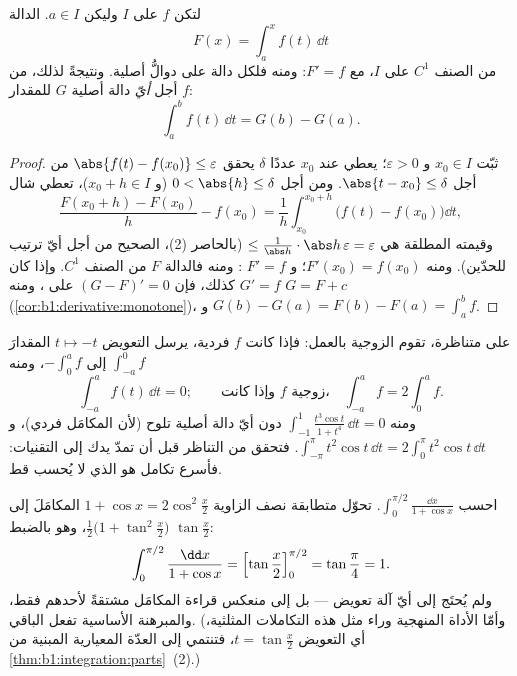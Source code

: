 \begin{theorem}\label{thm:b1:integration:ftc}
لتكن $f$  على  $I$ وليكن $a \in I$. الدالة
\[
F(x) = \int_a^x f(t)\, \dd t
\]
من الصنف $C^1$ على $I$، مع $F' = f$: ومنه فلكل دالة 
على  دوالُّ أصلية. ونتيجةً لذلك، من أجل \emph{أيّ}
دالة أصلية $G$ للمقدار $f$:
\[
\int_a^b f(t)\,\dd t = G(b) - G(a) .
\]
\end{theorem}

\begin{proof}
ثبّت $x_0 \in I$ و $\varepsilon > 0$؛ يعطي  عند $x_0$
عددًا $\delta$ يحقق $\abs{f(t) - f(x_0)} \leq \varepsilon$ من أجل $\abs{t -
x_0} \leq \delta$. ومن أجل $0 < \abs{h} \leq \delta$ (و $x_0 + h \in
I$)، تعطي شال
\[
\frac{F(x_0 + h) - F(x_0)}{h} - f(x_0)
= \frac 1h \int_{x_0}^{x_0+h} \bigl(f(t) - f(x_0)\bigr)\dd t ,
\]
وقيمته المطلقة هي $\leq \frac{1}{\abs h}\cdot \abs h\,
\varepsilon = \varepsilon$ (بالحاصر (2)، الصحيح من أجل أيّ ترتيب
للحدّين). ومنه $F'(x_0) = f(x_0)$؛ و $F' = f$ : ومنه فالدالة $F$
من الصنف $C^1$. وإذا كان $G' = f$ كذلك، فإن $(G - F)' = 0$ على ، ومنه $G =
F + c$ (\cref{cor:b1:derivative:monotone})، و $G(b) - G(a) = F(b)
- F(a) = \int_a^b f$.
\end{proof}

\begin{example}\label{ex:b1:integration:parity}
على  متناظرة، تقوم الزوجية بالعمل: فإذا كانت $f$ فردية،
يرسل التعويض $t \mapsto -t$ المقدارَ $\int_{-a}^{0} f$ إلى
$-\int_0^a f$، ومنه
\[
\int_{-a}^{a} f(t)\,\dd t = 0 ;
\qquad\text{وإذا كانت $f$ زوجية،}\quad
\int_{-a}^{a} f = 2\int_0^a f .
\]
ومنه $\int_{-1}^{1} \frac{t^3\cos t}{1 + t^4}\,\dd t = 0$ دون
أيّ دالة أصلية تلوح (لأن المكامَل فردي)، و
$\int_{-\pi}^{\pi} t^2\cos t\,\dd t = 2\int_0^\pi t^2\cos t\,
\dd t$. فتحقق من التناظر قبل أن تمدّ يدك إلى التقنيات: فأسرع
تكامل هو الذي لا يُحسب قط.
\end{example}

\begin{example}\label{ex:b1:integration:halfangle}
احسب $\displaystyle\int_0^{\pi/2} \frac{\dd x}{1 + \cos x}$.
تحوّل متطابقة نصف الزاوية $1 + \cos x = 2\cos^2\frac x2$ المكامَلَ
إلى $\frac{1}{2}\bigl(1 + \tan^2\frac
x2\bigr)$، وهو بالضبط  $\tan\frac x2$:
\[
\int_0^{\pi/2} \frac{\dd x}{1 + \cos x}
= \Bigl[\tan\frac x2\Bigr]_0^{\pi/2} = \tan\frac\pi4 = 1 .
\]
ولم يُحتَج إلى أيّ آلة تعويض --- بل إلى منعكس
قراءة المكامَل مشتقةً لأحدهم فقط، والمبرهنة
الأساسية تفعل الباقي. (وأمّا الأداة المنهجية وراء مثل هذه
التكاملات المثلثية، أي التعويض $t = \tan\frac x2$،
فتنتمي إلى العدّة المعيارية المبنية من
\cref{thm:b1:integration:parts}~(2).)
\end{example}

